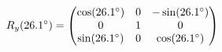 \documentclass[preview]{standalone}
\begin{document}
\begin{align*}
\special{dvisvgm:raw <g id='unique000'>}R_y(26.1^\circ) = \begin{pmatrix} \cos(26.1^\circ) & 0 & -\sin(26.1^\circ) \\ 0 & 1 & 0 \\ \sin(26.1^\circ) & 0 & \cos(26.1^\circ) \end{pmatrix}\special{dvisvgm:raw </g>}
\end{align*}
\end{document}
